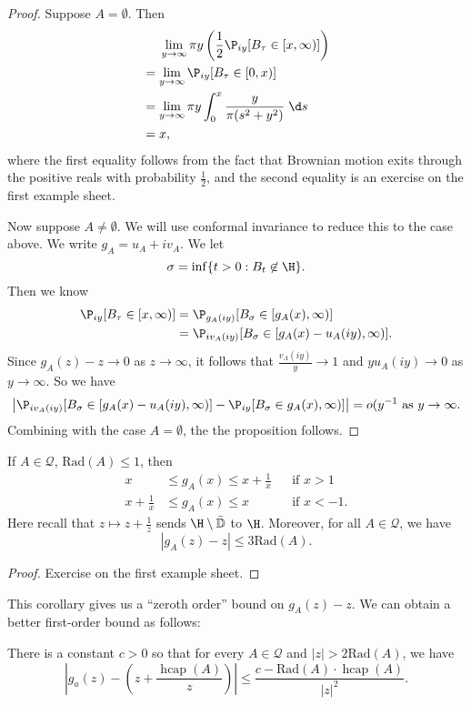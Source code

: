 \documentclass[a4paper]{article}
\renewcommand\D{\mathbb{D}}
\DeclareMathOperator\hcap{hcap}
\newcommand\rad{\mathrm{Rad}}
\begin{document}
\begin{proof}
  Suppose $A = \emptyset$. Then
  \begin{align*}
    &\hphantom{{}={}}\lim_{y \to \infty} \pi y \left(\frac{1}{2} \P_{iy}[B_\tau \in [x, \infty)]\right)\\
    &= \lim_{y \to \infty} \P_{iy} [B_\tau \in [0, x)]\\
    &=\lim_{y \to \infty} \pi y \int_0^x \frac{y}{\pi (s^2 + y^2)}\;\d s\\
    &= x,
  \end{align*}
  where the first equality follows from the fact that Brownian motion exits through the positive reals with probability $\frac{1}{2}$, and the second equality is an exercise on the first example sheet.

  Now suppose $A \not= \emptyset$. We will use conformal invariance to reduce this to the case above. We write $g_A = u_A + i v_A$. We let
  \[
    \sigma = \inf \{t > 0: B_t \not \in \H\}.
  \]
  Then we know
  \begin{align*}
    \P_{iy} [B_\tau \in [x, \infty)] &= \P_{g_A(iy)} [B_\sigma \in [g_A(x), \infty)]\\
    &= \P_{iv_A(iy)} [B_\sigma \in [g_A(x) - u_A(iy), \infty)].
  \end{align*}
  Since $g_A(z) - z \to 0$ as $z \to \infty$, it follows that $\frac{v_A(iy)}{y} \to 1$ and $y u_A(iy) \to 0$ as $y \to \infty$. So we have
  \[
    \left|\P_{iv_A(iy)} [B_\sigma \in [g_A(x) - u_A(iy), \infty)] - \P_{iy}[B_\sigma \in g_A(x), \infty)]\right| = o(y^{-1}\text{ as }y \to \infty.
  \]
  Combining with the case $A = \emptyset$, the the proposition follows.
\end{proof}

\begin{cor}
  If $A \in \mathcal{Q}$, $\rad(A) \leq 1$, then
  \begin{align*}
    x &\leq g_A(x) \leq x + \frac{1}{x}&&\text{if }x > 1\\
    x + \frac{1}{x} &\leq g_A(x) \leq x && \text{if }x < -1.
  \end{align*}
  Here recall that $z \mapsto z + \frac{1}{z}$ sends $\H \setminus \bar{\D}$ to $\H$. Moreover, for all $A \in \mathcal{Q}$, we have
  \[
    |g_A(z) - z| \leq 3 \rad(A).
  \]
\end{cor}

\begin{proof}
  Exercise on the first example sheet.
\end{proof}
This corollary gives us a ``zeroth order'' bound on $g_A(z) - z$. We can obtain a better first-order bound as follows:
\begin{prop}
  There is a constant $c > 0$ so that for every $A \in \mathcal{Q}$ and $|z| > 2 \rad(A)$, we have
  \[
    \left|g_a(z) - \left(z + \frac{\hcap(A)}{z}\right)\right| \leq \frac{c - \rad(A) \cdot \hcap(A)}{|z|^2}.
  \]
\end{prop}
\end{document}
